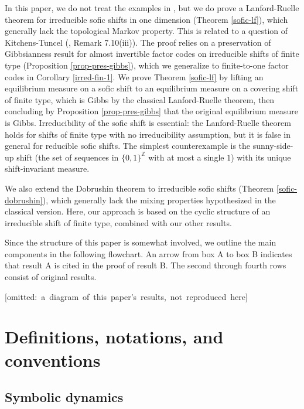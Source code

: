 \documentclass{amsproc}
\numberwithin{theorem}{section}
\theoremstyle{remark}
\theoremstyle{definition}
\newcommand{\Z}{\mathbb{Z}}
\theoremstyle{plain}
\begin{document}
In this paper, we do not treat the examples in \cite{meyerovitch2013gibbs}, but we do prove a Lanford-Ruelle theorem for irreducible sofic shifts in one dimension (Theorem \ref{sofic-lf}), which generally lack the topological Markov property. This is related to a question of Kitchens-Tuncel (\cite{kitchens-tuncel-1985-sofic}, Remark 7.10(iii)). The proof relies on a preservation of Gibbsianness result for almost invertible factor codes on irreducible shifts of finite type (Proposition \ref{prop-pres-gibbs}), which we generalize to finite-to-one factor codes in Corollary \ref{irred-fin-1}. We prove Theorem \ref{sofic-lf} by lifting an equilibrium measure on a sofic shift to an equilibrium measure on a covering shift of finite type, which is Gibbs by the classical Lanford-Ruelle theorem, then concluding by Proposition \ref{prop-pres-gibbs} that the original equilibrium measure is Gibbs. Irreducibility of the sofic shift is essential: the Lanford-Ruelle theorem holds for shifts of finite type with no irreducibility assumption, but it is false in general for reducible sofic shifts. The simplest counterexample is the sunny-side-up shift (the set of sequences in $\{ 0,1 \}^{\Z}$ with at most a single $1$) with its unique shift-invariant measure.



We also extend the Dobrushin theorem to irreducible sofic shifts (Theorem \ref{sofic-dobrushin}), which generally lack the mixing properties hypothesized in the classical version. Here, our approach is based on the cyclic structure of an irreducible shift of finite type, combined with our other results.

Since the structure of this paper is somewhat involved, we outline the main components in the following flowchart. An arrow from box A to box B indicates that result A is cited in the proof of result B. The second through fourth rows consist of original results.

\vspace{1em}



{\centering

\mbox{[omitted: a diagram of this paper's results, not reproduced here]}
}

\section{Definitions, notations, and conventions}

\subsection{Symbolic dynamics}\label{symb-din-subsection}
\end{document}
